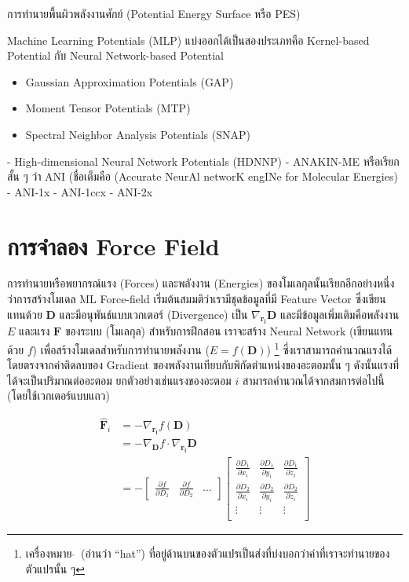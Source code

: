 การทำนายพื้นผิวพลังงานศักย์ (Potential Energy Surface หรือ PES)

Machine Learning Potentials (MLP) แบ่งออกได้เป็นสองประเภทคือ Kernel-based Potential กับ Neural Network-based Potential

\begin{itemize}
    \item Gaussian Approximation Potentials (GAP)\autocite{bartok2010}
    \item Moment Tensor Potentials (MTP)\autocite{shapeev2016}
    \item Spectral Neighbor Analysis Potentials (SNAP)\autocite{thompson2015}
\end{itemize}


- High-dimensional Neural Network Potentials (HDNNP)\autocite{behler2007}
- ANAKIN-ME หรือเรียกสั้น ๆ ว่า ANI (ชื่อเต็มคือ (Accurate NeurAl networK engINe for Molecular Energies)
    - ANI-1x\autocite{smith2017}
    - ANI-1ccx\autocite{smith2018}
    - ANI-2x\autocite{smith2019}

\section{การจำลอง Force Field}

การทำนายหรือพยากรณ์แรง (Forces) และพลังงาน (Energies) ของโมเลกุลนั้นเรียกอีกอย่างหนึ่งว่าการสร้างโมเดล ML Force-field 
เริ่มต้นสมมติว่าเรามีชุดข้อมูลที่มี Feature Vector ซึ่งเขียนแทนด้วย $\mathbf{D}$ และมีอนุพันธ์แบบเวกเตอร์ (Divergence) เป็น 
$\nabla_{\mathbf{r_i}} \mathbf{D}$ และมีข้อมูลเพิ่มเติมคือพลังงาน $E$ และแรง $\mathbf{F}$ ของระบบ (โมเลกุล) สำหรับการฝึกสอน
เราจะสร้าง Neural Network (เขียนแทนด้วย $f$) เพื่อสร้างโมเดลสำหรับการทำนายพลังงาน ($\hat{E} = f(\mathbf{D})$)
\footnote{เครื่องหมาย $\hat{}$\, (อ่านว่า \enquote{hat}) ที่อยู่ด้านบนของตัวแปรเป็นส่งที่บ่งบอกว่าค่าที่เราจะทำนายของตัวแปรนั้น ๆ}
ซึ่งเราสามารถคำนวณแรงได้โดยตรงจากค่าติดลบของ Gradient ของพลังงานเทียบกับพิกัดตำแหน่งของอะตอมนั้น ๆ ดังนั้นแรงที่ได้จะเป็นปริมาณต่ออะตอม
ยกตัวอย่างเช่นแรงของอะตอม $i$ สามารถคำนวณได้จากสมการต่อไปนี้ (โดยใช้เวกเตอร์แบบแถว)

\begin{align}\label{eq:force_pred}
\hat{\mathbf{F}}_i &= - \nabla_{\mathbf{r_i}} f(\mathbf{D}) \\
&= - \nabla_{\mathbf{D}} f \cdot \nabla_{\mathbf{r_i}} \mathbf{D}\\
&= - \begin{bmatrix}
    \frac{\partial f}{\partial D_1} & \frac{\partial f}{\partial D_2} & \dots
\end{bmatrix}
\begin{bmatrix}
    \frac{\partial D_1}{\partial x_i} & \frac{\partial D_1}{\partial y_i} & \frac{\partial D_1}{\partial z_i}\\
    \frac{\partial D_2}{\partial x_i} & \frac{\partial D_2}{\partial y_i} & \frac{\partial D_2}{\partial z_i}\\
    \vdots & \vdots & \vdots \\
\end{bmatrix}
\end{align}

